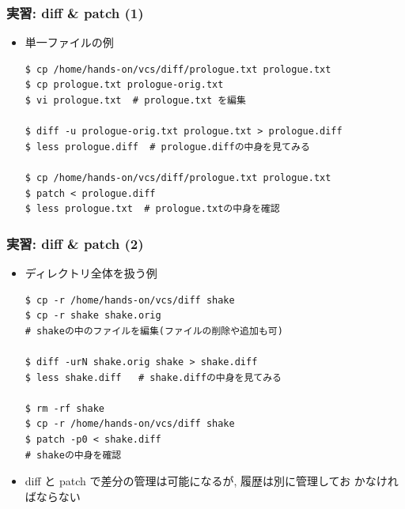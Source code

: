 \begin{frame}[t,fragile]
  \frametitle{実習: diff \& patch (1)}
  \begin{itemize}
  \item 単一ファイルの例
\begin{lstlisting}
$ cp /home/hands-on/vcs/diff/prologue.txt prologue.txt
$ cp prologue.txt prologue-orig.txt
$ vi prologue.txt  # prologue.txt を編集

$ diff -u prologue-orig.txt prologue.txt > prologue.diff
$ less prologue.diff  # prologue.diffの中身を見てみる
  
$ cp /home/hands-on/vcs/diff/prologue.txt prologue.txt
$ patch < prologue.diff
$ less prologue.txt  # prologue.txtの中身を確認
\end{lstlisting}
  \end{itemize}
\end{frame}

\begin{frame}[t,fragile]
  \frametitle{実習: diff \& patch (2)}
  \begin{itemize}
  \item ディレクトリ全体を扱う例
\begin{lstlisting}
$ cp -r /home/hands-on/vcs/diff shake
$ cp -r shake shake.orig
# shakeの中のファイルを編集(ファイルの削除や追加も可)

$ diff -urN shake.orig shake > shake.diff
$ less shake.diff   # shake.diffの中身を見てみる

$ rm -rf shake
$ cp -r /home/hands-on/vcs/diff shake
$ patch -p0 < shake.diff
# shakeの中身を確認
\end{lstlisting}
  \item diff と patch で差分の管理は可能になるが, 履歴は別に管理してお
    かなければならない
  \end{itemize}
\end{frame}

